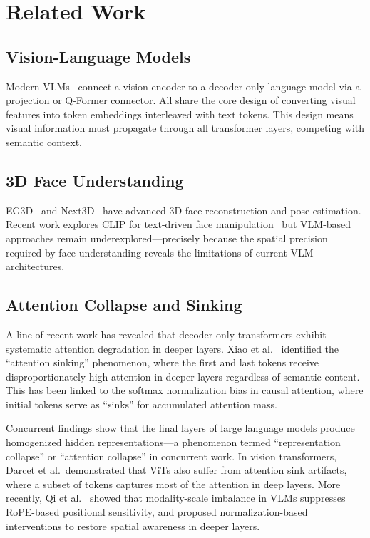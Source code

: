 \documentclass[10pt,twocolumn,letterpaper]{article}
\begin{document}
\section{Related Work}
\label{sec:related}

\subsection{Vision-Language Models}

Modern VLMs~\cite{LLaVA,Qwen3VL} connect a vision encoder to a decoder-only language model via a projection or Q-Former connector. All share the core design of converting visual features into token embeddings interleaved with text tokens. This design means visual information must propagate through all transformer layers, competing with semantic context.

\subsection{3D Face Understanding}

EG3D~\cite{EG3D} and Next3D~\cite{Next3D} have advanced 3D face reconstruction and pose estimation. Recent work explores CLIP for text-driven face manipulation~\cite{Local3DEditing} but VLM-based approaches remain underexplored---precisely because the spatial precision required by face understanding reveals the limitations of current VLM architectures.

\subsection{Attention Collapse and Sinking}

A line of recent work has revealed that decoder-only transformers exhibit systematic attention degradation in deeper layers. Xiao et al.~\cite{attention_sinking} identified the ``attention sinking'' phenomenon, where the first and last tokens receive disproportionately high attention in deeper layers regardless of semantic content. This has been linked to the softmax normalization bias in causal attention, where initial tokens serve as ``sinks'' for accumulated attention mass.

Concurrent findings show that the final layers of large language models produce homogenized hidden representations---a phenomenon termed ``representation collapse'' or ``attention collapse'' in concurrent work. In vision transformers, Darcet et al.\ demonstrated that ViTs also suffer from attention sink artifacts, where a subset of tokens captures most of the attention in deep layers. More recently, Qi et al.~\cite{Qi2025beyond} showed that modality-scale imbalance in VLMs suppresses RoPE-based positional sensitivity, and proposed normalization-based interventions to restore spatial awareness in deeper layers.
\end{document}
